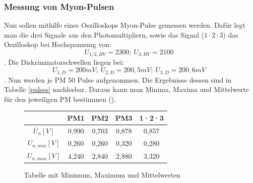         \subsubsection{Messung von Myon-Pulsen}
            Nun sollen mithilfe eines Oszilloskops Myon-Pulse gemessen werden. Dafür legt man die drei Signale aus den Photomultipliern, sowie das Signal ($1\cdot 2 \cdot 3$) das Oszilloskop bei Hochspannung von: $$ U_{1/2,HV} = 2300;\ U_{3,HV} = 2100 $$. Die Diskriminatorschwellen liegen bei: $$ U_{1,D} = 200\unit{mV};\ U_{2,D} = 200,5\unit{mV};\ U_{3,D} = 200,6\unit{mV} $$. Nun werden je PM 50 Pulse aufgenommen. Die Ergebnisse dessen sind in Tabelle \ref{pulses} nachlesbar. Daraus kann man Minima, Maxima und Mittelwerte für den jeweiligen PM bestimmen ().
            \begin{figure}[htbp]
                \centering
                \begin{tabular}{c||c|c|c|c}
                                                & PM1   & PM2   & PM3 & 1·2·3\\
                       \hline $\overline U_{n}  [\unit{V}]$  & 0,990 & 0,703 & 0,878 & 0,857\\
                                       $U_{n,min} [\unit{V}]$& 0,260 & 0,260 & 0,320 & 0,280\\
                                       $U_{n,max} [\unit{V}]$& 4,240 & 2,840 & 2,880 & 3,320\\ 
                \end{tabular}
                \caption{Tabelle mit Minimum, Maximum und Mittelwerten}
            \end{figure}
